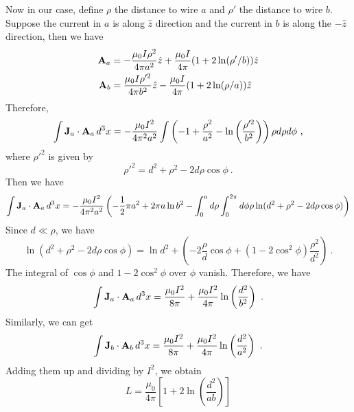 \documentclass[12pt]{article}
\newcommand{\bJ}{{\bf J}}
\newcommand{\A}{{\bf A}}
\begin{document}
Now in our case, define $\rho$ the distance to wire $a$ and $\rho'$ the distance to wire $b$. Suppose the current in $a$ is along $\hat{z}$ direction and the current in $b$ is along the $-\hat{z}$ direction, then we have
\begin{align}
    \A_a &= -\frac{\mu_0 I \rho^2}{4\pi a^2} \hat{z} +\frac{\mu_0 I}{4\pi} (1 + 2\ln(\rho'/b))\hat{z}\\
    \A_b &= \frac{\mu_0 I \rho'^2}{4\pi b^2} \hat{z} - \frac{\mu_0 I}{4\pi} (1 + 2\ln(\rho/a))\hat{z}
\end{align}
Therefore,
\begin{align}
    \int \bJ_a \cdot \A_a \, d^3 x = - \frac{\mu_0 I^2}{4\pi^2 a^2}\int \left(-1 + \frac{\rho^2}{a^2} - \ln\left(\frac{\rho'^2}{b^2}\right) \right) \rho d\rho d\phi~,
\end{align}
where $\rho'^2$ is given by
\begin{equation}
    \rho'^2 = d^2 + \rho^2 - 2 d\rho \cos \phi~.
\end{equation}
Then we have
\begin{equation}
    \int \bJ_a \cdot \A_a \, d^3 x = - \frac{\mu_0 I^2}{4 \pi^2 a^2} \left(-\frac{1}{2} \pi a^2 + 2\pi a \ln b^2 - \int_0^a d\rho \int_0^{2\pi} d\phi \rho \ln(d^2 + \rho^2 - 2d \rho \cos \phi)\right)
\end{equation}
Since $d \ll \rho$, we have
\begin{equation}
    \ln (d^2 + \rho^2 - 2d \rho \cos \phi) = \ln d^2 + \left(-2 \frac{\rho}{d}\cos \phi + (1-2\cos^2 \phi) \frac{\rho^2}{d^2}\right)~.
\end{equation}
The integral of $\cos \phi$ and $1 - 2\cos^2 \phi$ over $\phi$ vanish. Therefore, we have
\begin{align}
    \int \bJ_a \cdot \A_a \, d^3 x = \frac{\mu_0 I^2}{8\pi} + \frac{\mu_0 I^2}{4 \pi} \ln\left(\frac{d^2}{b^2}\right)~.
\end{align}
Similarly, we can get
\begin{align}
    \int \bJ_b \cdot \A_b \, d^3 x = \frac{\mu_0 I^2}{8\pi} + \frac{\mu_0 I^2}{4 \pi } \ln\left(\frac{d^2}{a^2}\right)~.
\end{align}
Adding them up and dividing by $I^2$, we obtain
\begin{equation}
    \boxed{L = \frac{\mu_0}{4\pi}\left[1 + 2\ln\left(\frac{d^2}{ab}\right)\right]  }
\end{equation}
\end{document}
